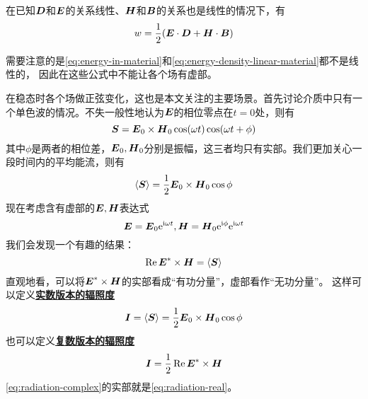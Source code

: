 \documentclass[UTF8, a4paper]{ctexart}
\newcommand*{\ii}{\mathrm{i}}
\newcommand*{\ee}{\mathrm{e}}
\newcommand{\average}[1]{\langle #1 \rangle}
\newcommand*{\concept}[1]{\underline{\textbf{#1}}}
\begin{document}
在已知$\vb*{D}$和$\vb*{E}$的关系线性、$\vb*{H}$和$\vb*{B}$的关系也是线性的情况下，有
\begin{equation}
    w = \frac{1}{2} (\vb*{E} \cdot \vb*{D} + \vb*{H} \cdot \vb*{B})
    \label{eq:energy-density-linear-material}
\end{equation}

需要注意的是\eqref{eq:energy-in-material}和\eqref{eq:energy-density-linear-material}都不是线性的，
因此在这些公式中不能让各个场有虚部。

在稳态时各个场做正弦变化，这也是本文关注的主要场景。首先讨论介质中只有一个单色波的情况。不失一般性地认为$\vb*{E}$的相位零点在$t=0$处，则有
\[
    \vb*{S} = \vb*{E}_0 \times \vb*{H}_0 \cos(\omega t) \cos(\omega t + \phi)
\]
其中$\phi$是两者的相位差，$\vb*{E}_0, \vb*{H}_0$分别是振幅，这三者均只有实部。我们更加关心一段时间内的平均能流，则有
\[
    \average{\vb*{S}} = \frac{1}{2} \vb*{E}_0 \times \vb*{H}_0 \cos \phi
\]
现在考虑含有虚部的$\vb*{E}, \vb*{H}$表达式
\[
    \vb*{E} = \vb*{E}_0 \ee^{\ii \omega t}, \vb*{H} = \vb*{H}_0 \ee^{\ii \phi} \ee^{\ii \omega t}
\]
我们会发现一个有趣的结果：
\[
    \Re \vb*{E}^* \times \vb*{H} = \average{\vb*{S}}
\]
直观地看，可以将$\vb*{E}^* \times \vb*{H}$的实部看成“有功分量”，虚部看作“无功分量”。
这样可以定义\concept{实数版本的辐照度}
\begin{equation}
    \vb*{I} = \average{\vb*{S}} = \frac{1}{2} \vb*{E}_0 \times \vb*{H}_0 \cos \phi
    \label{eq:radiation-real}
\end{equation}
也可以定义\concept{复数版本的辐照度}
\begin{equation}
    \vb*{I} = \frac{1}{2} \Re \vb*{E}^* \times \vb*{H}
    \label{eq:radiation-complex}
\end{equation}
\eqref{eq:radiation-complex}的实部就是\eqref{eq:radiation-real}。
\end{document}
